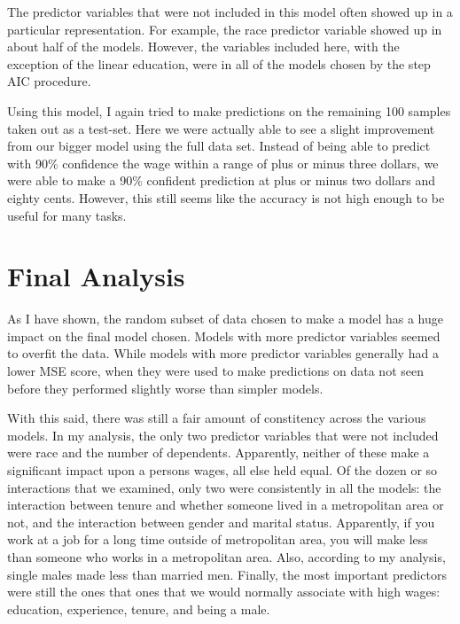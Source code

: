 \documentclass[12pt,a4paper,twoside]{article}
\begin{document}
The predictor variables that were not included in this model often showed up in a particular representation. For example, the race predictor variable showed up in about half of the models. However, the variables included here, with the exception of the linear education, were in all of the models chosen by the step AIC procedure.

Using this model, I again tried to make predictions on the remaining 100 samples taken out as a test-set. Here we were actually able to see a slight improvement from our bigger model using the full data set. Instead of being able to predict with 90\% confidence the wage within a range of plus or minus three dollars, we were able to make a 90\% confident prediction at plus or minus two dollars and eighty cents. However, this still seems like the accuracy is not high enough to be useful for many tasks.
\section{Final Analysis}
As I have shown, the random subset of data chosen to make a model has a huge impact on the final model chosen. Models with more predictor variables seemed to overfit the data. While models with more predictor variables generally had a lower MSE score, when they were used to make predictions on data not seen before they performed slightly worse than simpler models. 

With this said, there was still a fair amount of constitency across the various models. In my analysis, the only two predictor variables that were not included were race and the number of dependents. Apparently, neither of these make a significant impact upon a persons wages, all else held equal. Of the dozen or so interactions that we examined, only two were consistently in all the models: the interaction between tenure and whether someone lived in a metropolitan area or not, and the interaction between gender and marital status. Apparently, if you work at a job for a long time outside of metropolitan area, you will make less than someone who works in a metropolitan area. Also, according to my analysis, single males made less than married men. Finally, the most important predictors were still the ones that ones that we would normally associate with high wages: education, experience, tenure, and being a male.   
\end{document}
